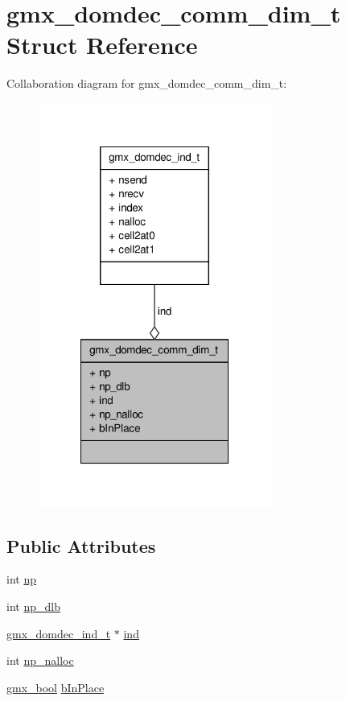 \hypertarget{structgmx__domdec__comm__dim__t}{\section{gmx\-\_\-domdec\-\_\-comm\-\_\-dim\-\_\-t \-Struct \-Reference}
\label{structgmx__domdec__comm__dim__t}
}


\-Collaboration diagram for gmx\-\_\-domdec\-\_\-comm\-\_\-dim\-\_\-t\-:
\nopagebreak
\begin{figure}[H]
\begin{center}
\leavevmode
\includegraphics[width=216pt]{structgmx__domdec__comm__dim__t__coll__graph}
\end{center}
\end{figure}
\subsection*{\-Public \-Attributes}
\begin{DoxyCompactItemize}
\item 
int \hyperlink{structgmx__domdec__comm__dim__t_a7ae9d826fc1e44caf6f9698d880b9994}{np}
\item 
int \hyperlink{structgmx__domdec__comm__dim__t_a98671bd8cb8fb05935421fac51afb056}{np\-\_\-dlb}
\item 
\hyperlink{structgmx__domdec__ind__t}{gmx\-\_\-domdec\-\_\-ind\-\_\-t} $\ast$ \hyperlink{structgmx__domdec__comm__dim__t_a5c330017383291a7fb238c9d2be263e3}{ind}
\item 
int \hyperlink{structgmx__domdec__comm__dim__t_a337ea5d8a7aa946b3b4f3cb75e6b53ec}{np\-\_\-nalloc}
\item 
\hyperlink{include_2types_2simple_8h_a8fddad319f226e856400d190198d5151}{gmx\-\_\-bool} \hyperlink{structgmx__domdec__comm__dim__t_a8e327121954d0c3c388b892af2844f3d}{b\-In\-Place}
\end{DoxyCompactItemize}


